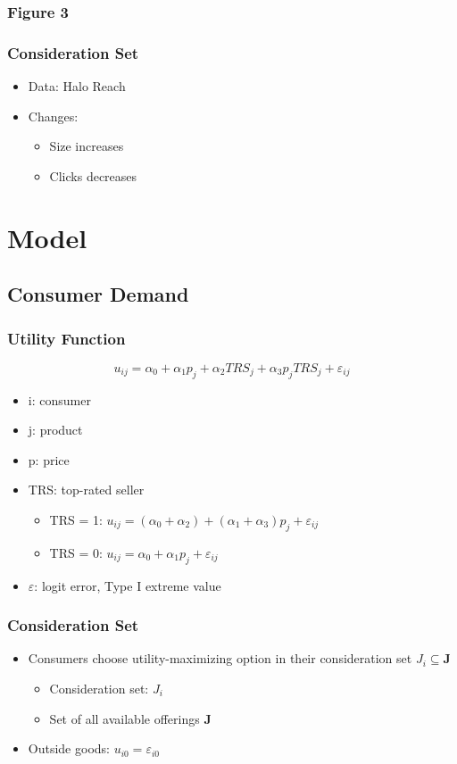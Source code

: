 \documentclass{beamer}
\begin{document}
\begin{frame}
\frametitle{Figure 3}
\end{frame}

\begin{frame}
\frametitle{Consideration Set}
\begin{itemize}
\item Data: Halo Reach
\item Changes:
\begin{itemize}
\item Size increases
\item Clicks decreases
\end{itemize}
\end{itemize}
\end{frame}

\section{Model}
\subsection{Consumer Demand}
\begin{frame}
\frametitle{Utility Function}
$$
u_{ij}  =  \alpha_0+\alpha_1 p_j + \alpha_2 TRS_j+ \alpha_3 p_j TRS_j + \varepsilon_{ij}
$$
\begin{itemize}
\item i: consumer
\item j: product
\item p: price
\item TRS: top-rated seller
\begin{itemize}
\item TRS = 1: $u_{ij}  =  (\alpha_0+\alpha_2)+(\alpha_1+\alpha_3) p_j + \varepsilon_{ij}$
\item TRS = 0: $u_{ij}  =  \alpha_0+\alpha_1 p_j + \varepsilon_{ij}$
\end{itemize}
\item $\varepsilon$: logit error, Type I extreme value
\end{itemize}
\end{frame}

\begin{frame}
\frametitle{Consideration Set}
\begin{itemize}
\item Consumers choose utility-maximizing option in their consideration set $J_i \subseteq \mathbf{J}$
\begin{itemize}
\item Consideration set: $J_i$
\item Set of all available offerings $\mathbf{J}$
\end{itemize}
\item Outside goods: $u_{i0} = \varepsilon_{i0}$
\end{itemize}
\end{frame}
\end{document}
